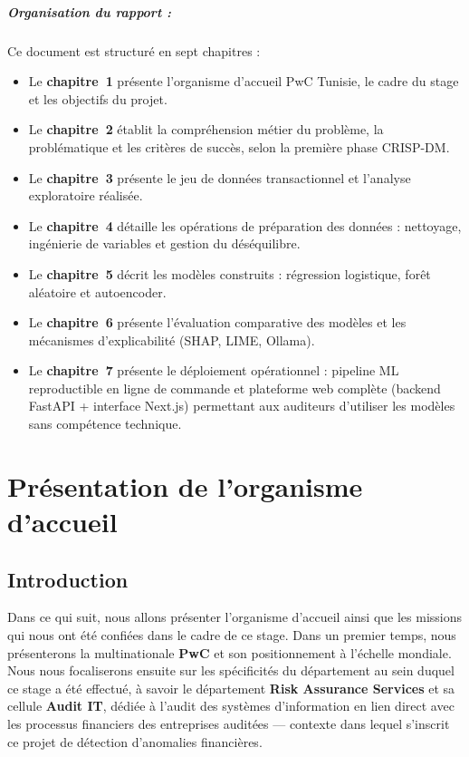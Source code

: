 \documentclass[12pt,a4paper,twoside]{report}
\begin{document}
\paragraph{Organisation du rapport : } Ce document est structuré en sept chapitres :
\begin{itemize}
  \item Le \textbf{chapitre~1} présente l'organisme d'accueil PwC Tunisie, le cadre du stage et les objectifs du projet.
  \item Le \textbf{chapitre~2} établit la compréhension métier du problème, la problématique et les critères de succès, selon la première phase CRISP-DM.
  \item Le \textbf{chapitre~3} présente le jeu de données transactionnel et l'analyse exploratoire réalisée.
  \item Le \textbf{chapitre~4} détaille les opérations de préparation des données : nettoyage, ingénierie de variables et gestion du déséquilibre.
  \item Le \textbf{chapitre~5} décrit les modèles construits : régression logistique, forêt aléatoire et autoencoder.
  \item Le \textbf{chapitre~6} présente l'évaluation comparative des modèles et les mécanismes d'explicabilité (SHAP, LIME, Ollama).
  \item Le \textbf{chapitre~7} présente le déploiement opérationnel : pipeline ML reproductible en ligne de commande et plateforme web complète (backend FastAPI + interface Next.js) permettant aux auditeurs d'utiliser les modèles sans compétence technique.
\end{itemize}

\chapter{Présentation de l'organisme d'accueil}

\section*{Introduction}

Dans ce qui suit, nous allons présenter l'organisme d'accueil ainsi que les missions qui nous ont été confiées dans le cadre de ce stage. Dans un premier temps, nous présenterons la multinationale \textbf{PwC} et son positionnement à l'échelle mondiale. Nous nous focaliserons ensuite sur les spécificités du département au sein duquel ce stage a été effectué, à savoir le département \textbf{Risk Assurance Services} et sa cellule \textbf{Audit IT}, dédiée à l'audit des systèmes d'information en lien direct avec les processus financiers des entreprises auditées — contexte dans lequel s'inscrit ce projet de détection d'anomalies financières.
\end{document}
